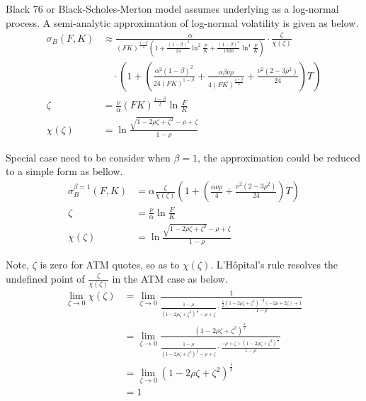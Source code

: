 \documentclass{article}
\begin{document}
Black 76 or Black-Scholes-Merton model assumes underlying as a log-normal process.
A semi-analytic approximation of log-normal volatility is given as below.
\begin{subequations}
    \begin{align}
        \sigma_B{(F, K)} &\approx \frac{\alpha}{(FK)^{\frac{1 - \beta}{2}}\left(1 + \frac{\left(1 - \beta\right)^2}{24} \ln^2{\frac{F}{K}} + \frac{{\left(1 - \beta\right)}^{4}}{1920} \ln^4{\frac{F}{K}}\right)} \cdot \frac{\zeta}{\chi (\zeta)} \nonumber \\
        & \quad \cdot \left(1 + \left(\frac{\alpha^2 {\left(1 - \beta\right)}^{2}}{24 \left(F K\right)^{1 - \beta}} + \frac{\alpha \beta \nu \rho}{4 {\left(F K\right)}^{\frac{1 - \beta}{2}}} + \frac{\nu^2 \left(2 - 3 \rho^2\right)}{24}\right) T\right)\\
        \zeta &= \frac{\nu}{\alpha} {(F K)}^{\frac{1 - \beta}{2}} \ln{\frac{F}{K}} \\
        \chi(\zeta) &= \ln{\frac{\sqrt{1 - 2 \rho \zeta + {\zeta}^2} - \rho + \zeta}{1 - \rho}}
    \end{align}
\end{subequations}

Special case need to be consider when $ \beta = 1 $, the approximation could be reduced to a simple form as bellow.
\begin{subequations} \label{SABR_LogNormal_Beta_1}
    \begin{align}
        \sigma_B^{\beta = 1}{(F, K)} &= \alpha \frac{\zeta}{\chi(\zeta)} \left(1 + \left(\frac{\alpha \nu \rho}{4} + \frac{\nu^2 \left(2 - 3 \rho^2\right)}{24}\right) T \right) \\
        \zeta &= \frac{\nu}{\alpha} \ln{\frac{F}{K}} \\
        \chi(\zeta) &= \ln{\frac{\sqrt{1 - 2 \rho \zeta + \zeta^2} - \rho + \zeta}{1 - \rho}}
    \end{align}
\end{subequations}

Note, $ \zeta $ is zero for ATM quotes, so as to $ \chi(\zeta) $.
L'H\^opital's rule resolves the undefined point of $ \frac{\zeta}{\chi(\zeta)} $ in the ATM case as below.
\begin{align}
    \lim_{\zeta \to 0}{\chi(\zeta)} &= \lim_{\zeta \to 0}{\frac{1}{\frac{1 - \rho}{\left(1 - 2 \rho \zeta + \zeta^2\right)^{\frac{1}{2}} - \rho + \zeta} \cdot \frac{\frac{1}{2}\left(1 - 2 \rho \zeta + \zeta^2\right)^{-\frac{1}{2}}\left(-2\rho + 2 \zeta \right) + 1}{1 - \rho}}} \nonumber \\
    &= \lim_{\zeta \to 0}{\frac{\left(1 - 2 \rho \zeta + \zeta^2\right)^{\frac{1}{2}}}{\frac{1 - \rho}{\left(1 - 2 \rho \zeta + \zeta^2\right)^{\frac{1}{2}} - \rho + \zeta} \cdot \frac{-\rho + \zeta + \left(1 - 2 \rho \zeta + \zeta^2\right)^{\frac{1}{2}}}{1 - \rho}}} \nonumber \\
    &= \lim_{\zeta \to 0}{\left(1 - 2 \rho \zeta + \zeta^2\right)^{\frac{1}{2}}} \nonumber \\
    &= 1
\end{align}
\end{document}
